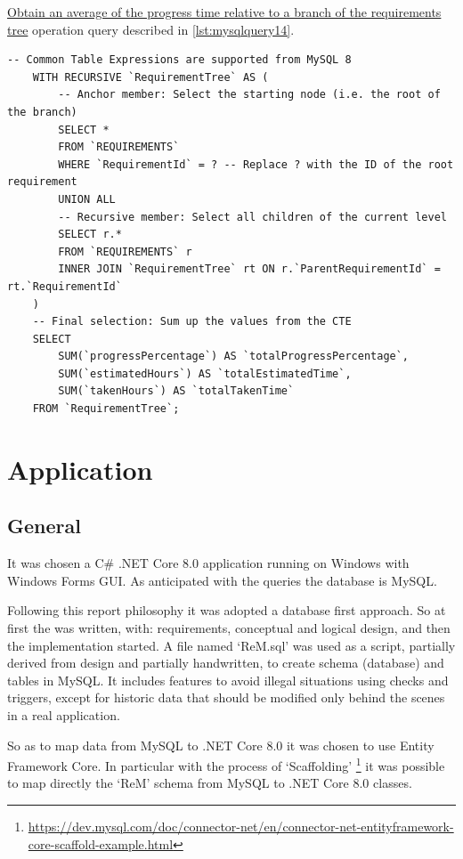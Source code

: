 \documentclass[12pt, a4paper]{report}
\begin{document}
\hyperref[subsubsec:op14]{Obtain an average of the progress time relative to a branch of the requirements tree} operation
query described in \autoref{lst:mysqlquery14}.

\begin{lstlisting}[language=MySQL, caption={\texorpdfstring{\hyperref[subsubsec:op14]{op. 14}}{op. 14}}, label={lst:mysqlquery14}]
    -- Common Table Expressions are supported from MySQL 8
    WITH RECURSIVE `RequirementTree` AS (
        -- Anchor member: Select the starting node (i.e. the root of the branch)
        SELECT *
        FROM `REQUIREMENTS`
        WHERE `RequirementId` = ? -- Replace ? with the ID of the root requirement
        UNION ALL
        -- Recursive member: Select all children of the current level
        SELECT r.*
        FROM `REQUIREMENTS` r
        INNER JOIN `RequirementTree` rt ON r.`ParentRequirementId` = rt.`RequirementId`
    )
    -- Final selection: Sum up the values from the CTE
    SELECT
        SUM(`progressPercentage`) AS `totalProgressPercentage`,
        SUM(`estimatedHours`) AS `totalEstimatedTime`,
        SUM(`takenHours`) AS `totalTakenTime`
    FROM `RequirementTree`;
\end{lstlisting}

\chapter*{Application}

\section*{General}

It was chosen a C\# .NET Core 8.0 application running on Windows with Windows Forms GUI.
As anticipated with the queries the database is MySQL.

Following this report philosophy it was adopted a database first approach.
So at first the  was written, with: requirements, conceptual and logical design, and then the
implementation started.
A file named `ReM.sql' was used as a script, partially derived from design and partially handwritten, to create schema (database)
and tables in MySQL. It includes features to avoid illegal situations using checks and triggers, except for historic data that
should be modified only behind the scenes in a real application.

So as to map data from MySQL to .NET Core 8.0 it was chosen to use Entity Framework Core.
In particular with the process of `Scaffolding'
\footnote{\url{https://dev.mysql.com/doc/connector-net/en/connector-net-entityframework-core-scaffold-example.html}}
it was possible to map directly the `ReM' schema from MySQL to .NET Core 8.0 classes.


\end{document}
